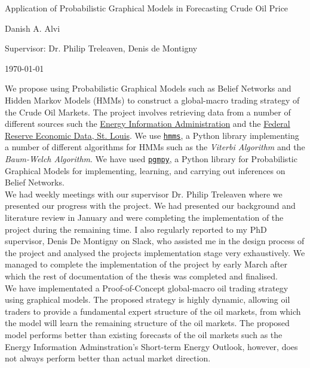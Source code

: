 \documentclass[a4paper]{article}
\begin{document}

\Large
 \begin{center}
Application of Probabilistic Graphical Models in Forecasting Crude Oil Price\\ 

\hspace{10pt}

\large
Danish A. Alvi \\

\hspace{10pt}

\large
Supervisor: Dr. Philip Treleaven, Denis de Montigny \\

\hspace{10pt}

\today

\hspace{10pt}

\end{center}

\hspace{10pt}

\normalsize
We propose using Probabilistic Graphical Models such as Belief Networks and Hidden Markov Models (HMMs) to construct a global-macro trading strategy of the Crude Oil Markets. The project involves retrieving data from a number of different sources such the \href{https://www.eia.gov/}{Energy Information Administration} and the \href{https://fred.stlouisfed.org/}{Federal Reserve Economic Data, St. Louis}. We use \href{https://github.com/lopatovsky/HMMs}{\texttt{hmms}}, a Python library implementing a number of different algorithms for HMMs such as the \textit{Viterbi Algorithm} and the \textit{Baum-Welch Algorithm}. We have used \href{https://github.com/pgmpy/pgmpy}{\texttt{pgmpy}}, a Python library for Probabilistic Graphical Models for implementing, learning, and carrying out inferences on Belief Networks. \\

We had weekly meetings with our supervisor Dr. Philip Treleaven where we presented our progress with the project. We had presented our background and literature review in January and were completing the implementation of the project during the remaining time. I also regularly reported to my PhD supervisor, Denis De Montigny on Slack, who assisted me in the design process of the project and analysed the projects implementation stage very exhaustively. We managed to complete the implementation of the project by early March after which the rest of documentation of the thesis was completed and finalised.\\

We have implementated a Proof-of-Concept global-macro oil trading strategy using graphical models. The proposed strategy is highly dynamic, allowing oil traders to provide a fundamental expert structure of the oil markets, from which the model will learn the remaining structure of the oil markets. The proposed model performs better than existing forecasts of the oil markets such as the Energy Information Adminstration's Short-term Energy Outlook, however, does not always perform better than actual market direction.
\end{document}
